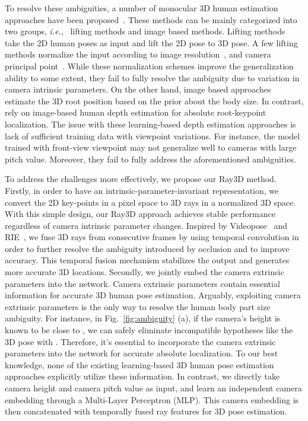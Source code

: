 \documentclass[10pt,twocolumn,letterpaper]{article}
\def\ie{\emph{i.e.}}
\begin{document}
To resolve these ambiguities, a number of monocular 3D human estimation approaches have been proposed~\cite{ju2019absposelifter,dario2019videopose,jianan2020smap,andrei2018deep,dabral2019multi,moon2019camera}. These methods can be mainly categorized into two groups, \ie, ~lifting methods and image based methods. Lifting methods ~\cite{yujun2019exploiting,ChengYWWT19,DabralMKASJ18,dario2019videopose,ZhangHW2020,ZhouH0XW17,LiuSW0CA20} take the 2D human poses as input and lift the 2D pose to 3D pose. A few lifting methods normalize the input according to image resolution~\cite{dario2019videopose}, and camera principal point~\cite{ju2019absposelifter}. While these normalization schemes improve the generalization ability to some extent, they fail to fully resolve the ambiguity due to variation in camera intrinsic parameters. On the other hand, image based approaches~\cite{moon2019camera,dabral2019multi,andrei2018monocular,lassner2017unite,smplify,zerong2019deephuman,nikos2019learning,aaron3d2018} estimate the 3D root position based on the prior about the body size. In contrast, \cite{jianan2020smap,moon2019camera} rely on image-based human depth estimation for absolute root-keypoint localization. The issue with these learning-based depth estimation approaches is lack of sufficient training data with viewpoint variations. For instance, the model trained with front-view viewpoint may not generalize well to cameras with large pitch value. Moreover, they fail to fully address the aforementioned ambiguities. 
	
To address the challenges more effectively, we propose our Ray3D method. Firstly, in order to have an intrinsic-parameter-invariant representation, we convert the 2D key-points in a pixel space to 3D rays in a normalized 3D space. With this simple design, our Ray3D approach achieves stable performance regardless of camera intrinsic parameter changes. 
Inspired by Videopose~\cite{dario2019videopose} and RIE~\cite{wenkang2021improving}, we fuse 3D rays from consecutive frames by using temporal convolution in order to further resolve the ambiguity introduced by occlusion and to improve accuracy. This temporal fusion mechanism stabilizes the output and generates more accurate 3D locations. Secondly, we jointly embed the camera extrinsic parameters into the network. Camera extrinsic parameters contain essential information for accurate 3D human pose estimation. Arguably, exploiting camera extrinsic parameters is the only way to resolve the human body part size ambiguity. For instance, in Fig.~\ref{fig:ambiguity} (a), if the camera's height is known to be close to , we can safely eliminate incompatible hypotheses like the 3D pose with . Therefore, it's essential to incorporate the camera extrinsic parameters into the network for accurate absolute localization. To our best knowledge, none of the existing learning-based 3D human pose estimation approaches explicitly utilize these information. In contrast, we directly take camera height and camera pitch value as input, and learn an independent camera embedding through a Multi-Layer Perceptron (MLP). This camera embedding is then concatenated with temporally fused ray features for 3D pose estimation. 
\end{document}
